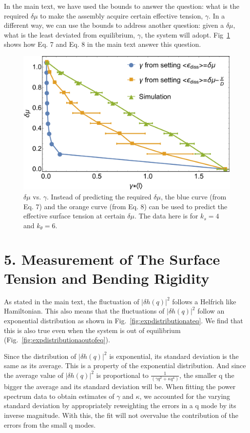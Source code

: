 \documentclass[amsmath,preprintnumbers,10pt,nofootinbib,prl,twocolumn]{revtex4-1}
\begin{document}
In the main text, we have used the bounds to answer the question: what is the required $\delta\mu$ to make the assembly acquire certain effective tension, $\gamma$. In a different way, we can use the bounds to address another question: given a $\delta\mu$, what is the least deviated from equilibrium, $\gamma$, the system will adopt. Fig~\ref{fig:epsilonpredict} shows how Eq. 7 and Eq. 8 in the main text answer this question.
\begin{figure}[tbb]
\centering
\includegraphics[scale=0.27]{Fig4.pdf}
\caption{$\delta\mu$ vs. $\gamma$. Instead of predicting the required $\delta\mu$, the blue curve (from Eq. 7) and the orange curve (from Eq. 8) can be used to predict the effective surface tension at certain $\delta \mu$. The data here is for $k_s=4$ and $k_\theta = 6$.} \label{fig:epsilonpredict}
\end{figure}


\section{5. Measurement of The Surface Tension and Bending Rigidity}

As stated in the main text, the fluctuation of $|\delta h(q)|^2$ follows  a Helfrich like Hamiltonian. This also means that the fluctuations of $|\delta h(q)|^2$ follow an exponential distribution as shown in Fig.~\ref{fig:expdistributionateq}. We find that this is also true even when the system is out of equilibrium (Fig.~\ref{fig:expdistributionaoutofeq}).

Since the distribution of $|\delta h(q)|^2$ is exponential, its standard deviation is the same as its average. This is a property of the exponential distribution. And since the average value of $|\delta h(q)|^2$ is proportional to $\frac{1}{(\gamma q^2+\kappa q^4)}$, the smaller q the bigger the average and its standard deviation will be. When fitting the power spectrum data to obtain estimates of $\gamma$ and $\kappa$, we accounted for the varying standard deviation by appropriately reweighting the errors in a q mode by its inverse magnitude. With this, the fit will not overvalue the contribution of the errors from the small q modes.
 
\end{document}
